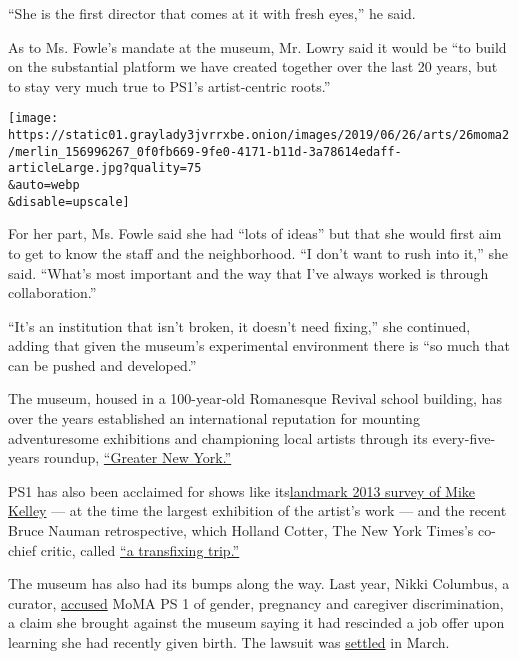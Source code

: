 ``She is the first director that comes at it with fresh eyes,'' he said.

As to Ms. Fowle's mandate at the museum, Mr. Lowry said it would be ``to
build on the substantial platform we have created together over the last
20 years, but to stay very much true to PS1's artist-centric roots.''

\texttt{[image: https://static01.graylady3jvrrxbe.onion/images/2019/06/26/arts/26moma2/merlin\_156996267\_0f0fb669-9fe0-4171-b11d-3a78614edaff-articleLarge.jpg?quality=75\\\&auto=webp\\\&disable=upscale]}

For her part, Ms. Fowle said she had ``lots of ideas'' but that she
would first aim to get to know the staff and the neighborhood. ``I don't
want to rush into it,'' she said. ``What's most important and the way
that I've always worked is through collaboration.''

``It's an institution that isn't broken, it doesn't need fixing,'' she
continued, adding that given the museum's experimental environment there
is ``so much that can be pushed and developed.''

The museum, housed in a 100-year-old Romanesque Revival school building,
has over the years established an international reputation for mounting
adventuresome exhibitions and championing local artists through its
every-five-years roundup,
\href{https://momaps1.org/exhibitions/view/403}{``Greater New York.''}

PS1 has also been acclaimed for shows like
its\href{https://www.moma.org/calendar/exhibitions/3744}{landmark 2013
survey of Mike Kelley} --- at the time the largest exhibition of the
artist's work --- and the recent Bruce Nauman retrospective, which
Holland Cotter, The New York Times's co-chief critic, called
\href{https://www.nytimes3xbfgragh.onion/2018/10/19/arts/design/bruce-nauman-review-museum-of-modern-art-moma-ps-1.html?rref=collection\%2Ftimestopic\%2FPS\%201\%20Contemporary\%20Art\%20Center\&action=click\&contentCollection=timestopics\&region=stream\&module=stream_unit\&version=latest\&contentPlacement=2\&pgtype=collection}{``a
transfixing trip.''}

The museum has also had its bumps along the way. Last year, Nikki
Columbus, a curator,
\href{https://www.nytimes3xbfgragh.onion/2018/07/06/arts/design/moma-ps1-discrimination-suit-baby.html?module=inline}{accused}
MoMA PS 1 of gender, pregnancy and caregiver discrimination, a claim she
brought against the museum saying it had rescinded a job offer upon
learning she had recently given birth. The lawsuit was
\href{https://www.nytimes3xbfgragh.onion/2019/03/26/arts/design/moma-ps1-settles-with-curator-who-said-giving-birth-cost-her-job-offer.html}{settled}
in March.

